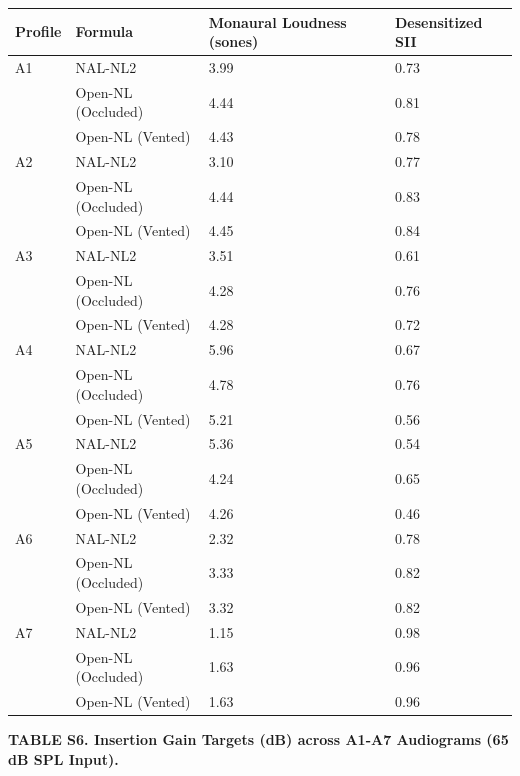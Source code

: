 \documentclass[
  12pt,
]{article}
\begin{document}
\begin{longtable}[]{@{}llll@{}}
\toprule\noalign{}
Profile & Formula & Monaural Loudness (sones) & Desensitized SII \\
\midrule\noalign{}
\endhead
\bottomrule\noalign{}
\endlastfoot
A1 & NAL-NL2 & 3.99 & 0.73 \\
& Open-NL (Occluded) & 4.44 & 0.81 \\
& Open-NL (Vented) & 4.43 & 0.78 \\
A2 & NAL-NL2 & 3.10 & 0.77 \\
& Open-NL (Occluded) & 4.44 & 0.83 \\
& Open-NL (Vented) & 4.45 & 0.84 \\
A3 & NAL-NL2 & 3.51 & 0.61 \\
& Open-NL (Occluded) & 4.28 & 0.76 \\
& Open-NL (Vented) & 4.28 & 0.72 \\
A4 & NAL-NL2 & 5.96 & 0.67 \\
& Open-NL (Occluded) & 4.78 & 0.76 \\
& Open-NL (Vented) & 5.21 & 0.56 \\
A5 & NAL-NL2 & 5.36 & 0.54 \\
& Open-NL (Occluded) & 4.24 & 0.65 \\
& Open-NL (Vented) & 4.26 & 0.46 \\
A6 & NAL-NL2 & 2.32 & 0.78 \\
& Open-NL (Occluded) & 3.33 & 0.82 \\
& Open-NL (Vented) & 3.32 & 0.82 \\
A7 & NAL-NL2 & 1.15 & 0.98 \\
& Open-NL (Occluded) & 1.63 & 0.96 \\
& Open-NL (Vented) & 1.63 & 0.96 \\
\end{longtable}

\textbf{TABLE S6. Insertion Gain Targets (dB) across A1-A7 Audiograms
(65 dB SPL Input).}
\end{document}
